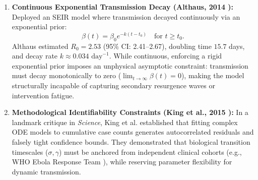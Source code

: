 \documentclass[11pt,a4paper]{article}
\begin{document}
\begin{enumerate}
    \item \textbf{Continuous Exponential Transmission Decay (Althaus, 2014 \cite{althaus2014estimating}):} Deployed an SEIR model where transmission decayed continuously via an exponential prior:
    \begin{equation}
        \beta(t) = \beta_0 e^{-k(t - t_0)} \quad \text{for } t \ge t_0.
        \label{eq:althaus_beta}
    \end{equation}
    Althaus estimated $R_0 = 2.53$ (95\% CI: 2.41--2.67), doubling time $15.7$ days, and decay rate $k \approx 0.034\text{ day}^{-1}$. While continuous, enforcing a rigid exponential prior imposes an unphysical asymptotic constraint: transmission must decay monotonically to zero ($\lim_{t \to \infty} \beta(t) = 0$), making the model structurally incapable of capturing secondary resurgence waves or intervention fatigue.
    \item \textbf{Methodological Identifiability Constraints (King et al., 2015 \cite{king2015avoidable}):} In a landmark critique in \emph{Science}, King et al. established that fitting complex ODE models to cumulative case counts generates autocorrelated residuals and falsely tight confidence bounds. They demonstrated that biological transition timescales ($\sigma, \gamma$) must be anchored from independent clinical cohorts (e.g., WHO Ebola Response Team \cite{who2014ebola}), while reserving parameter flexibility for dynamic transmission.
\end{enumerate}
\end{document}
